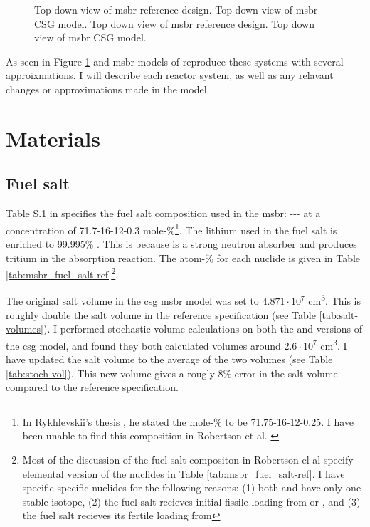 \begin{figure}[htpb]
{        \label{fig:msbr_model_xz}
    }
    \caption[Full views of MSBR]{
         Top down view of \Gls{msbr} reference design.
         Top down view of \Gls{msbr} CSG model.
         Top down view of \Gls{msbr} reference design.
         Top down view of \Gls{msbr} CSG model.
    }
    \label{fig:msbr-overview}
\end{figure}

As seen in Figure \ref{fig:msbr-overview} \OpenMC and \SerpentTWO \Gls{msbr}
models of reproduce these systems with several approixmations. I will
describe each reactor system, as well as any relavant changes or
approximations made in the model.

\section{Materials}
\label{sec:msbr-materials}

\subsection{Fuel salt}
\label{sub:msbr-fuel-salt}
Table S.1 in \cite{robertson_conceptual_1971} specifies the fuel salt
composition used in the \Gls{msbr}:
--- at a
concentration of 71.7-16-12-0.3 mole-\%\footnote{In Rykhlevskii's thesis
\cite{rykhlevskii_fuel_2020}, he stated the mole-\% to be 71.75-16-12-0.25. I
have been unable to find this composition in Robertson et al.
\cite{robertson_conceptual_1971}}. The lithium used in the fuel salt is
enriched to 99.995\% . This is because  is a strong
neutron absorber and produces tritium in the absorption reaction. The atom-\%
for each nuclide is given in Table \ref{tab:msbr_fuel_salt-ref}\footnote{Most of the
discussion of the fuel salt compositon in Robertson el al
\cite{robertson_conceptual_1971} specify elemental version of the nuclides in
Table \ref{tab:msbr_fuel_salt-ref}. I have specific specific nuclides for the
following reasons: (1) both  and  have only one stable isotope, (2)
the fuel salt recieves initial fissile loading from  or
, and (3) the fuel salt recieves its fertile loading from
}.

The original salt volume in the \Gls{csg} \Gls{msbr} model was set to
$4.871\cdot 10^7$ \unit{\centi\metre\cubed}. This is roughly double the salt
volume in the reference specification (see Table \ref{tab:salt-volumes}). I
performed stochastic volume calculations on both the \SerpentTWO and \OpenMC
versions of the \Gls{csg} model, and found they both calculated volumes around
$2.6\cdot 10^7$ \unit{\centi\metre\cubed}. I have updated the salt volume to the
average of the two volumes (see Table \ref{tab:stoch-vol}). This new volume
gives a rougly 8\% error in the salt volume compared to the reference
specification.

